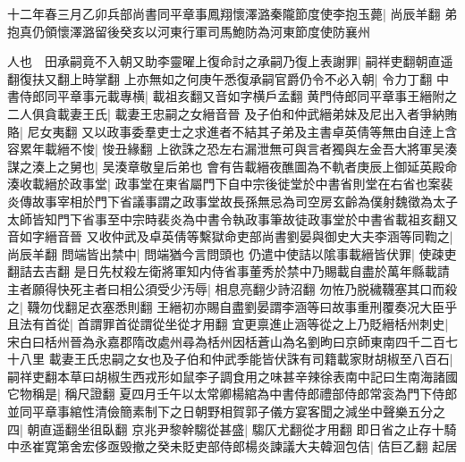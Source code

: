 十二年春三月乙卯兵部尚書同平章事鳳翔懷澤潞秦隴節度使李抱玉薨|{
	尚辰羊翻}
弟抱真仍領懷澤潞留後癸亥以河東行軍司馬鮑防為河東節度使防襄州

人也　田承嗣竟不入朝又助李靈曜上復命討之承嗣乃復上表謝罪|{
	嗣祥吏翻朝直遥翻復扶又翻上時掌翻}
上亦無如之何庚午悉復承嗣官爵仍令不必入朝|{
	令力丁翻}
中書侍郎同平章事元載專横|{
	載祖亥翻又音如字横戶孟翻}
黄門侍郎同平章事王縉附之二人俱貪載妻王氏|{
	載妻王忠嗣之女縉音晉}
及子伯和仲武縉弟妹及尼出入者爭納賄賂|{
	尼女夷翻}
又以政事委羣吏士之求進者不結其子弟及主書卓英倩等無由自逹上含容累年載縉不悛|{
	悛丑緣翻}
上欲誅之恐左右漏泄無可與言者獨與左金吾大將軍吴湊謀之湊上之舅也|{
	吴湊章敬皇后弟也}
會有告載縉夜醮圖為不軌者庚辰上御延英殿命湊收載縉於政事堂|{
	政事堂在東省屬門下自中宗後徙堂於中書省則堂在右省也案裴炎傳故事宰相於門下省議事謂之政事堂故長孫無忌為司空房玄齡為僕射魏徵為太子太師皆知門下省事至中宗時裴炎為中書令執政事筆故徒政事堂於中書省載祖亥翻又音如字縉音晉}
又收仲武及卓英倩等繫獄命吏部尚書劉晏與御史大夫李涵等同鞫之|{
	尚辰羊翻}
問端皆出禁中|{
	問端猶今言問頭也}
仍遣中使詰以隂事載縉皆伏罪|{
	使疎吏翻詰去吉翻}
是日先杖殺左衛將軍知内侍省事董秀於禁中乃賜載自盡於萬年縣載請主者願得快死主者曰相公須受少汚辱|{
	相息亮翻少詩沼翻}
勿恠乃脱穢韈塞其口而殺之|{
	韈勿伐翻足衣塞悉則翻}
王縉初亦賜自盡劉晏謂李涵等曰故事重刑覆奏况大臣乎且法有首從|{
	首謂罪首從謂從坐從才用翻}
宜更禀進止涵等從之上乃貶縉栝州刺史|{
	宋白曰栝州晉為永嘉郡隋改處州尋為栝州因栝蒼山為名劉昫曰京師東南四千二百七十八里}
載妻王氏忠嗣之女也及子伯和仲武季能皆伏誅有司籍載家財胡椒至八百石|{
	嗣祥吏翻本草曰胡椒生西戎形如鼠李子調食用之味甚辛辣徐表南中記曰生南海諸國}
它物稱是|{
	稱尺證翻}
夏四月壬午以太常卿楊綰為中書侍郎禮部侍郎常衮為門下侍郎並同平章事綰性清儉簡素制下之日朝野相賀郭子儀方宴客聞之減坐中聲樂五分之四|{
	朝直遥翻坐徂臥翻}
京兆尹黎幹騶從甚盛|{
	騶仄尤翻從才用翻}
即日省之止存十騎中丞崔寛第舍宏侈亟毁撤之癸未貶吏部侍郎楊炎諫議大夫韓洄包佶|{
	佶巨乙翻}
起居


